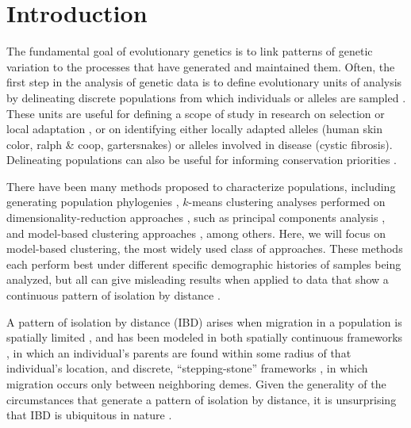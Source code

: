 \documentclass[12pt]{article}
\begin{document}


\newpage
\section*{Introduction}
The fundamental goal of evolutionary genetics is to link patterns of genetic variation 
to the processes that have generated and maintained them.
Often, the first step in the analysis of genetic data is to define evolutionary units of analysis
by delineating discrete populations from which individuals or alleles are sampled \citep{wright1949genetical}.
These units are useful for defining a scope of study in research on selection or local adaptation \citep{},
or on identifying either locally adapted alleles (human skin color, ralph \& coop, gartersnakes) or alleles involved in disease (cystic fibrosis).
Delineating populations can also be useful for informing conservation priorities \citep{}.

There have been many methods proposed to characterize populations,
including generating population phylogenies \citep{CavalliSforza1975, treemix},
$k$-means clustering analyses performed on dimensionality-reduction approaches \citep{}, 
such as principal components analysis \citep{menozzi1978synthetic,novembre_interpreting_2008, price2006eigenstrat},
and model-based clustering approaches \citep[e.g.][]{STRUCTURE, falush2003, hubisz2009,ADMIXTURE, FINESTRUCTURE, huelsenbeck2007inference, Corander2003,TESS}, among others.
Here, we will focus on model-based clustering, the most widely used class of approaches.
These methods each perform best under different specific demographic histories of samples being analyzed,
but all can give misleading results when applied to data that show a continuous pattern of isolation by distance \citep{Wright 1938, 1940, Wright1943}.

A pattern of isolation by distance (IBD) arises when migration in a population is spatially limited \citep{Slatkin1985},
and has been modeled in both spatially continuous frameworks \citep{Wright1943,Malecot1948}, 
in which an individual's parents are found within some radius of that individual's location,
and discrete, ``stepping-stone'' frameworks \citep{Kimura1953},
in which migration occurs only between neighboring demes.
Given the generality of the circumstances that generate a pattern of isolation by distance, 
it is unsurprising that IBD is ubiquitous in nature \citep{meirmans2012,Sexton_etal_2014}.
\end{document}
